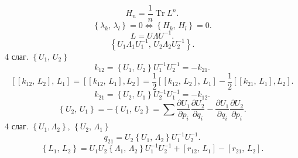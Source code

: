 \documentclass[a4paper]{article}
\begin{document}
 \[
H_n=\frac{1}{n} \operatorname{Tr}L^n
.\] 
\[
\left\{ \lambda_k,\,\lambda_l \right\} =0 \Leftrightarrow
\left\{ H_k,\,H_l \right\} =0
.\] 
\[
L=U \Lambda U^{-1}
.\] 
\[
\left\{ U_1 \Lambda_1 U_{1}^{-1},\,U_2 \Lambda_2 U_2^{-1} \right\} 
.\] 
4 слаг. $\left\{ U_1,\,U_2 \right\} $
\[
k_{12}=\left\{ U_1,\,U_2 \right\} U_{1}^{-1}U_2^{-1}=-k_{21}
.\] 
\[
\left[ \left[ k_{12},\,L_2 \right] ,\,L_1 \right] =\left[ 
\left[ k_{12},\,L_1 \right] ,L_2\right] =\frac{1}{2}\left[ 
\left[ k_{12},\,L_2 \right] ,\,L_1\right] -\frac{1}{2}\left[ 
\left[ k_{21},\,L_1 \right], L_2\right] 
.\] 
\[
k_{21}=\left\{ U_2,\,U_1 \right\} U_2^{-1}U_{1}^{-1}=-k_{12}
.\] 
\[
\left\{ U_2,\,U_1 \right\} =-\left\{ U_1,\,U_2 \right\} =
\sum_{}^{} \frac{\partial U_1}{\partial p_i} \frac{\partial U_2}{\partial q_i} -\frac{\partial U_1}{\partial q_i} \frac{\partial U_2}{\partial p_i} 
.\] 
4 слаг. $\left\{ U_1,\Lambda_2 \right\} $, $\left\{ U_2,\,\Lambda_1 \right\} $
\[
q_{21}=U_2\left\{ U_1,\,\Lambda_2 \right\} U_{1}^{-1}U_2^{-1}
.\] 
\[
\left\{ L_1,\,L_2 \right\} =U_1 U_2 \left\{ \Lambda_1,\,\Lambda_2 \right\} U_1^{-1}U_{2}^{-1}+\left[ r_{12},\,L_1 \right] -
\left[ r_{21},\,L_2 \right] 
.\] 
\end{document}
